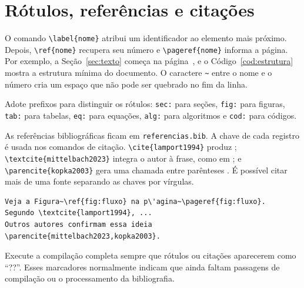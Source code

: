 \section{Rótulos, referências e citações}\label{sec:referencias-cruzadas}

O comando \lstinline|\label{nome}| atribui um identificador ao elemento mais próximo. Depois, \lstinline|\ref{nome}| recupera seu número e \lstinline|\pageref{nome}| informa a página. Por exemplo, a Seção~\ref{sec:texto} começa na página~\pageref{sec:texto}, e o Código~\ref{cod:estrutura} mostra a estrutura mínima do documento. O caractere \lstinline|~| entre o nome e o número cria um espaço que não pode ser quebrado no fim da linha.

Adote prefixos para distinguir os rótulos: \texttt{sec:} para seções, \texttt{fig:} para figuras, \texttt{tab:} para tabelas, \texttt{eq:} para equações, \texttt{alg:} para algoritmos e \texttt{cod:} para códigos.

As referências bibliográficas ficam em \texttt{referencias.bib}. A chave de cada registro é usada nos comandos de citação. \lstinline|\cite{lamport1994}| produz \cite{lamport1994}; \lstinline|\textcite{mittelbach2023}| integra o autor à frase, como em \textcite{mittelbach2023}; e \lstinline|\parencite{kopka2003}| gera uma chamada entre parênteses \parencite{kopka2003}. É possível citar mais de uma fonte separando as chaves por vírgulas.

\begin{lstlisting}[language={[LaTeX]TeX},caption={Exemplos de citações e referências cruzadas},label={cod:referencias}]
Veja a Figura~\ref{fig:fluxo} na p\'agina~\pageref{fig:fluxo}.
Segundo \textcite{lamport1994}, ...
Outros autores confirmam essa ideia \parencite{mittelbach2023,kopka2003}.
\end{lstlisting}

Execute a compilação completa sempre que rótulos ou citações aparecerem como ``??''. Esses marcadores normalmente indicam que ainda faltam passagens de compilação ou o processamento da bibliografia.
